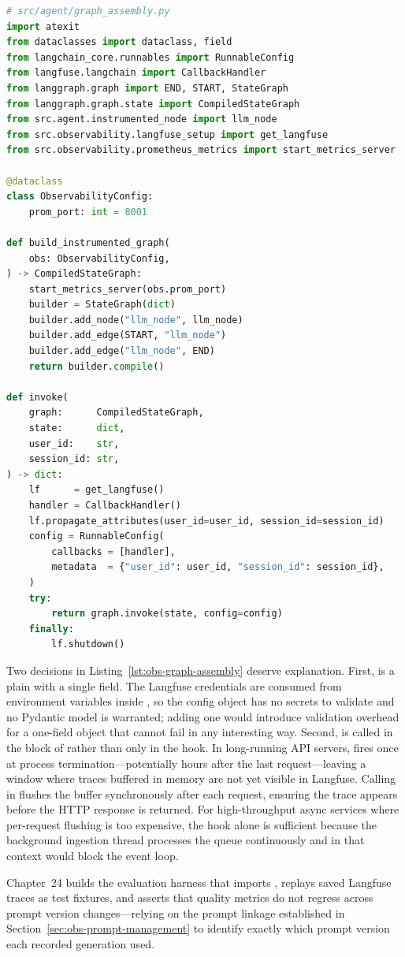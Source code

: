 \begin{lstlisting}[language=Python,
  caption={Graph assembly: all instrumentation layers wired;
  per-invocation \code{invoke} helper},
  label={lst:obs-graph-assembly}]
# src/agent/graph_assembly.py
import atexit
from dataclasses import dataclass, field
from langchain_core.runnables import RunnableConfig
from langfuse.langchain import CallbackHandler
from langgraph.graph import END, START, StateGraph
from langgraph.graph.state import CompiledStateGraph
from src.agent.instrumented_node import llm_node
from src.observability.langfuse_setup import get_langfuse
from src.observability.prometheus_metrics import start_metrics_server

@dataclass
class ObservabilityConfig:
    prom_port: int = 8001

def build_instrumented_graph(
    obs: ObservabilityConfig,
) -> CompiledStateGraph:
    start_metrics_server(obs.prom_port)
    builder = StateGraph(dict)
    builder.add_node("llm_node", llm_node)
    builder.add_edge(START, "llm_node")
    builder.add_edge("llm_node", END)
    return builder.compile()

def invoke(
    graph:      CompiledStateGraph,
    state:      dict,
    user_id:    str,
    session_id: str,
) -> dict:
    lf      = get_langfuse()
    handler = CallbackHandler()
    lf.propagate_attributes(user_id=user_id, session_id=session_id)
    config = RunnableConfig(
        callbacks = [handler],
        metadata  = {"user_id": user_id, "session_id": session_id},
    )
    try:
        return graph.invoke(state, config=config)
    finally:
        lf.shutdown()
\end{lstlisting}

Two decisions in Listing~\ref{lst:obs-graph-assembly} deserve
explanation. First,  is a plain
 with a single  field. The Langfuse
credentials are consumed from environment variables inside
, so the config object has no secrets to
validate and no Pydantic model is warranted; adding one would introduce
validation overhead for a one-field object that cannot fail in any
interesting way. Second,  is called in the
 block of  rather than only in the
 hook. In long-running API servers,  fires
once at process termination---potentially hours after the last
request---leaving a window where traces buffered in memory are not yet
visible in Langfuse. Calling  in 
flushes the buffer synchronously after each request, ensuring the
trace appears before the HTTP response is returned. For
high-throughput async services where per-request flushing is too
expensive, the  hook alone is sufficient because the
background ingestion thread processes the queue continuously and
 in that context would block the event loop.

Chapter~24 builds the evaluation harness that imports
, replays saved Langfuse traces as
test fixtures, and asserts that quality metrics do not regress across
prompt version changes---relying on the prompt linkage established in
Section~\ref{sec:obs-prompt-management} to identify exactly which
prompt version each recorded generation used.
